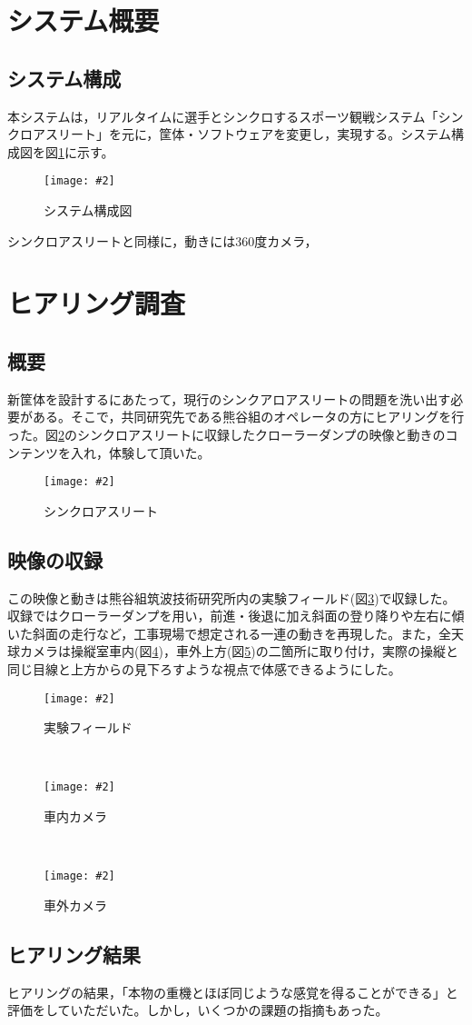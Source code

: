 \documentclass[a4paper,12pt]{jsarticle}
\newcommand{\figuref}[1]{図\ref{#1}}
\newcommand{\fig}[4][width=\textwidth]{
    \begin{figure}[!h]
    \begin{center}
    \texttt{[image: \#2]}
    \caption{#3}
    \label{#4}
    \vspace*{-1cm}
    \end{center}
    \end{figure}
}
\begin{document}
\clearpage

\section{システム概要}
\subsection{システム構成}
本システムは，リアルタイムに選手とシンクロするスポーツ観戦システム「シンクロアスリート」\cite{synchro}を元に，筐体・ソフトウェアを変更し，実現する。システム構成図を\figuref{sys_config}に示す。
\fig{image/sys_config.png}{システム構成図}{sys_config}

シンクロアスリートと同様に，動きには360度カメラ，

\clearpage

\section{ヒアリング調査}
\subsection{概要}
新筐体を設計するにあたって，現行のシンクアロアスリートの問題を洗い出す必要がある。そこで，共同研究先である熊谷組のオペレータの方にヒアリングを行った。\figuref{synchro_image}のシンクロアスリートに収録したクローラーダンプの映像と動きのコンテンツを入れ，体験して頂いた。
\fig[width=9cm]{image/synchro_image.jpg}{シンクロアスリート}{synchro_image}

\subsection{映像の収録}
この映像と動きは熊谷組筑波技術研究所内の実験フィールド(\figuref{test_field})で収録した。収録ではクローラーダンプを用い，前進・後退に加え斜面の登り降りや左右に傾いた斜面の走行など，工事現場で想定される一連の動きを再現した。また，全天球カメラは操縦室車内(\figuref{inside_camera})，車外上方(\figuref{outside_camera})の二箇所に取り付け，実際の操縦と同じ目線と上方からの見下ろすような視点で体感できるようにした。
\fig[width=9cm]{image/test_field.jpg}{実験フィールド}{test_field}
\\
\fig[width=9cm]{image/inside_camera.jpg}{車内カメラ}{inside_camera}
\\
\fig[width=9cm]{image/outside_camera.jpg}{車外カメラ}{outside_camera}

\clearpage
\subsection{ヒアリング結果}
ヒアリングの結果，「本物の重機とほぼ同じような感覚を得ることができる」と評価をしていただいた。しかし，いくつかの課題の指摘もあった。
\end{document}
